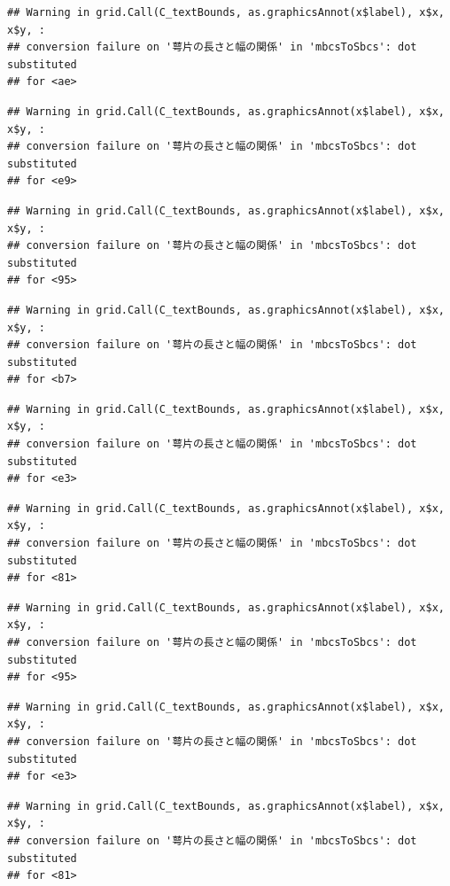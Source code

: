 \documentclass[
]{book}
\begin{document}
\begin{verbatim}
## Warning in grid.Call(C_textBounds, as.graphicsAnnot(x$label), x$x, x$y, :
## conversion failure on '萼片の長さと幅の関係' in 'mbcsToSbcs': dot substituted
## for <ae>
\end{verbatim}

\begin{verbatim}
## Warning in grid.Call(C_textBounds, as.graphicsAnnot(x$label), x$x, x$y, :
## conversion failure on '萼片の長さと幅の関係' in 'mbcsToSbcs': dot substituted
## for <e9>
\end{verbatim}

\begin{verbatim}
## Warning in grid.Call(C_textBounds, as.graphicsAnnot(x$label), x$x, x$y, :
## conversion failure on '萼片の長さと幅の関係' in 'mbcsToSbcs': dot substituted
## for <95>
\end{verbatim}

\begin{verbatim}
## Warning in grid.Call(C_textBounds, as.graphicsAnnot(x$label), x$x, x$y, :
## conversion failure on '萼片の長さと幅の関係' in 'mbcsToSbcs': dot substituted
## for <b7>
\end{verbatim}

\begin{verbatim}
## Warning in grid.Call(C_textBounds, as.graphicsAnnot(x$label), x$x, x$y, :
## conversion failure on '萼片の長さと幅の関係' in 'mbcsToSbcs': dot substituted
## for <e3>
\end{verbatim}

\begin{verbatim}
## Warning in grid.Call(C_textBounds, as.graphicsAnnot(x$label), x$x, x$y, :
## conversion failure on '萼片の長さと幅の関係' in 'mbcsToSbcs': dot substituted
## for <81>
\end{verbatim}

\begin{verbatim}
## Warning in grid.Call(C_textBounds, as.graphicsAnnot(x$label), x$x, x$y, :
## conversion failure on '萼片の長さと幅の関係' in 'mbcsToSbcs': dot substituted
## for <95>
\end{verbatim}

\begin{verbatim}
## Warning in grid.Call(C_textBounds, as.graphicsAnnot(x$label), x$x, x$y, :
## conversion failure on '萼片の長さと幅の関係' in 'mbcsToSbcs': dot substituted
## for <e3>
\end{verbatim}

\begin{verbatim}
## Warning in grid.Call(C_textBounds, as.graphicsAnnot(x$label), x$x, x$y, :
## conversion failure on '萼片の長さと幅の関係' in 'mbcsToSbcs': dot substituted
## for <81>
\end{verbatim}
\end{document}
